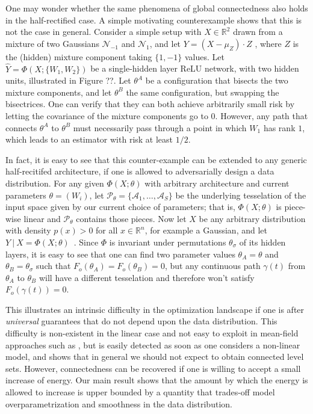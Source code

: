 \documentclass{article} %
\newcommand {\R} {{\mathbb{R}}}
\newcommand {\Forr} {F_{o}}
\begin{document}
One may wonder whether the same phenomena of global connectedness also holds 
in the half-rectified case. A simple motivating counterexample shows that this is not the case in 
general. Consider a simple setup with $X \in \R^2$ drawn from a mixture of two Gaussians $\mathcal{N}_{-1}$ 
and $\mathcal{N}_{1}$, and let $Y = (X-\mu_Z) \cdot Z $ , where $Z$ is the (hidden) mixture component taking $\{1,-1\}$ values.  Let 
$\hat{Y} = \Phi(X; \{ W_1, W_2\} )$ be a single-hidden layer ReLU network, with two hidden units, 
illustrated in Figure ??. 
Let $\theta^A$ be a configuration that bisects the two mixture components, 
and let $\theta^B$ the same configuration, but swapping the bisectrices. 
One can verify that they can both achieve arbitrarily small risk by letting the covariance of the mixture components go to $0$. 
However, any path that connects $\theta^A$ to $\theta^B$ 
must necessarily pass through a point in which $W_1$ has rank $1$, which leads to an estimator with risk at least $1/2$.  

In fact, it is easy to see that this counter-example can be extended to any generic half-recitifed architecture, if one is 
allowed to adversarially design a data distribution. For any given $\Phi(X; \theta)$ with arbitrary architecture and current parameters 
$\theta = (W_i)$, let $\mathcal{P}_\theta=\{ \mathcal{A}_1, \dots, \mathcal{A}_S\}$ be the underlying tesselation of the input space given by our current choice of parameters; that is, $\Phi(X; \theta)$ is piece-wise linear and $\mathcal{P}_\theta$ contains those pieces. Now let 
$X$ be any arbitrary distribution with density $p(x) > 0$ for all $x \in \R^n$, for example a Gaussian, and let %
$Y ~|~X = \Phi(X ; \theta)$~. Since $\Phi$ is invariant under permutations $\theta_\sigma$ of its hidden layers, it is easy to see that one can find two parameter values $\theta_A = \theta$ and $\theta_B = \theta_\sigma$ such that $\Forr(\theta_A) = \Forr(\theta_B) = 0$, but any continuous path $\gamma(t)$ from $\theta_A$ to $\theta_B$ will have a different tesselation and therefore won't satisfy $\Forr( \gamma(t) ) = 0$. 
 
This illustrates an intrinsic difficulty in the optimization landscape if one is after \emph{universal} 
guarantees that do not depend upon the data distribution. This difficulty is non-existent in the linear case 
and not easy to exploit in mean-field approaches such as \cite{choromaska}, but 
is easily detected as soon as one considers a non-linear model, and shows that in general 
we should not expect to obtain connected level sets. However, 
connectedness can be recovered if one is willing to accept a small increase 
of energy. Our main result shows that the amount by which the energy is 
allowed to increase is upper bounded by a quantity that trades-off model overparametrization 
and smoothness in the data distribution.
\end{document}
